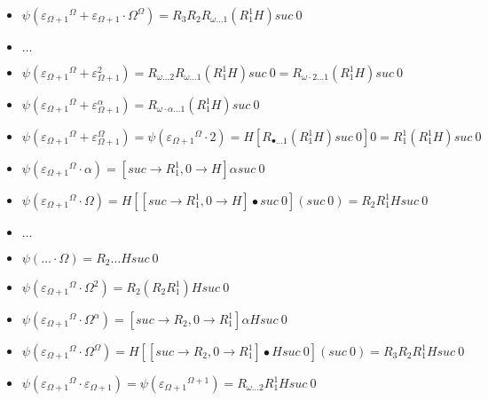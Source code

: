 \documentclass[10pt]{article}
\begin{document}
\begin{itemize}
\item \( \psi({\varepsilon_{\Omega+1}}^\Omega+\varepsilon_{\Omega+1} \cdot \Omega^\Omega) = R_3 R_2 R_{\omega \ldots 1} (R^1_1 H) suc\ 0 \)

\item \( \ldots \)

\item \( \psi({\varepsilon_{\Omega+1}}^\Omega+\varepsilon_{\Omega+1}^2) = R_{\omega \ldots 2} R_{\omega \ldots 1} (R^1_1 H) suc\ 0 = R_{\omega \cdot 2 \ldots 1} (R^1_1 H) suc\ 0 \)

\item \( \psi({\varepsilon_{\Omega+1}}^\Omega+\varepsilon_{\Omega+1}^\alpha) = R_{\omega \cdot \alpha \ldots 1} (R^1_1 H) suc\ 0 \)

\item \( \psi({\varepsilon_{\Omega+1}}^\Omega+\varepsilon_{\Omega+1}^\Omega) = \psi({\varepsilon_{\Omega+1}}^\Omega \cdot 2) = H [R_{\bullet \ldots 1} (R^1_1 H) suc\ 0] 0 = R^1_1 (R^1_1 H) suc\ 0 \)

\item \( \psi({\varepsilon_{\Omega+1}}^\Omega \cdot \alpha) = [suc \rightarrow R^1_1, 0 \rightarrow H] \alpha suc\ 0 \)

\item \( \psi({\varepsilon_{\Omega+1}}^\Omega \cdot \Omega) = H [[suc \rightarrow R^1_1, 0 \rightarrow H] \bullet suc\ 0] (suc\ 0) = R_2 R^1_1 H suc\ 0 \)

\item \( \ldots \)

\item \( \psi(\ldots \cdot \Omega) = R_2 \ldots H suc\ 0 \)

\item \( \psi({\varepsilon_{\Omega+1}}^\Omega \cdot \Omega^2) = R_2 (R_2 R^1_1) H suc\ 0 \)

\item \( \psi({\varepsilon_{\Omega+1}}^\Omega \cdot \Omega^\alpha) = [suc \rightarrow R_2, 0 \rightarrow R^1_1] \alpha H suc\ 0 \)

\item \( \psi({\varepsilon_{\Omega+1}}^\Omega \cdot \Omega^\Omega) = H [[suc \rightarrow R_2, 0 \rightarrow R^1_1] \bullet H suc\ 0] (suc\ 0) = R_3 R_2 R^1_1 H suc\ 0 \)

\item \( \psi({\varepsilon_{\Omega+1}}^\Omega \cdot \varepsilon_{\Omega+1}) = \psi({\varepsilon_{\Omega+1}}^{\Omega+1}) = R_{\omega \ldots 2} R^1_1 H suc\ 0 \)


\end{itemize}
\end{document}
